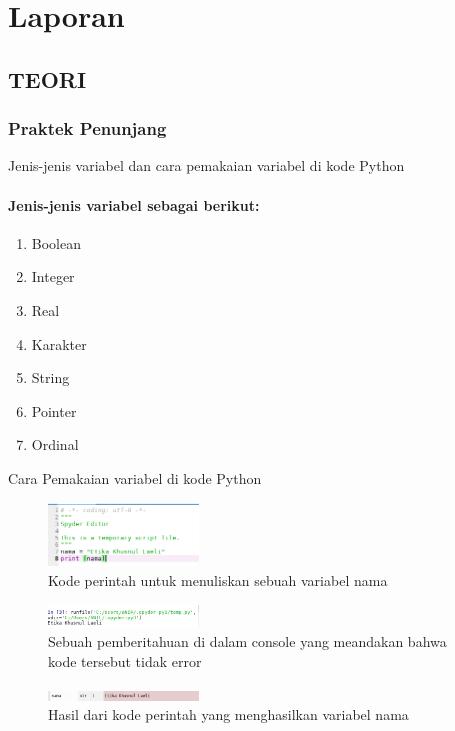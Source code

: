 \chapter{Laporan}
\section{TEORI}
\subsection{Praktek Penunjang}
Jenis-jenis variabel dan cara pemakaian variabel di kode Python
\subsubsection {Jenis-jenis variabel sebagai berikut:}
\begin{enumerate}
\item Boolean
\item Integer
\item Real
\item Karakter
\item String
\item Pointer
\item Ordinal
\end{enumerate}
\hfill \break
Cara Pemakaian variabel di kode Python
\begin{figure}[H]
		\includegraphics[width=4cm]{figures/1184065/Var1.PNG}
		\centering
		\caption{Kode perintah untuk menuliskan sebuah variabel nama}
\end{figure}
\begin{figure}[H]
		\includegraphics[width=4cm]{figures/1184065/Var2.PNG}
		\centering
		\caption{Sebuah pemberitahuan di dalam console yang meandakan bahwa kode tersebut tidak error}
\end{figure}
\begin{figure}[H]
		\includegraphics[width=4cm]{figures/1184065/Var3.PNG}
		\centering
		\caption{Hasil dari kode perintah yang menghasilkan variabel nama}
\end{figure}
